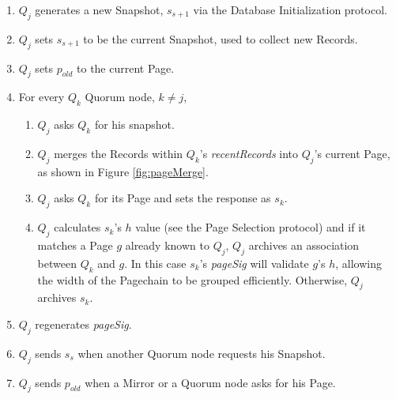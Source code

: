 \begin{enumerate}
	\item $ Q_{j} $ generates a new Snapshot, $ s_{s+1} $ via the Database Initialization protocol.
	\item $ Q_{j} $ sets $ s_{s+1} $ to be the current Snapshot, used to collect new Records.
	\item $ Q_{j} $ sets $ p_{\mathit{old}} $ to the current Page.
	\item For every $ Q_{k} $ Quorum node, $ k \ne j $,
		\begin{enumerate}
			\item $ Q_{j} $ asks $ Q_{k} $ for his snapshot.
			\item $ Q_{j} $ merges the Records within $ Q_{k} $'s \emph{recentRecords} into $ Q_{j} $'s current Page, as shown in Figure \ref{fig:pageMerge}.
			\item $ Q_{j} $ asks $ Q_{k} $ for its Page and sets the response as $ s_{k} $.
			\item $ Q_{j} $ calculates $ s_{k} $'s $ h $ value (see the Page Selection protocol) and if it matches a Page $ g $ already known to $ Q_{j} $, $ Q_{j} $ archives an association between $ Q_{k} $ and $ g $. In this case $ s_{k} $'s \emph{pageSig} will validate $ g $'s $ h $, allowing the width of the Pagechain to be grouped efficiently. Otherwise, $ Q_{j} $ archives $ s_{k} $.
		\end{enumerate}
	\item $ Q_{j} $ regenerates \emph{pageSig}.
	\item $ Q_{j} $ sends $ s_{s} $ when another Quorum node requests his Snapshot.
	\item $ Q_{j} $ sends $ p_{\mathit{old}} $ when a Mirror or a Quorum node asks for his Page.
\end{enumerate}

